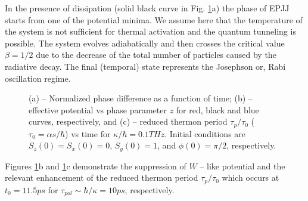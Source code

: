 \documentclass[aps, pre, preprint, groupedaddress, superscriptaddress, showkeys, showpacs] {revtex4-1}
\begin{document}
In the presence of dissipation (solid black curve in Fig. \ref{pic:phase}a) the phase of EPJJ starts from one of the potential minima.
We assume here that the temperature of the system is not sufficient for thermal activation and the quantum tunneling is possible. The system evolves adiabatically and then  crosses the critical value $\beta = 1/2$
due to the decrease of the total number of particles caused by the radiative decay.
The final (temporal) state represents the Josephson or, Rabi oscillation regime.
%
\begin{figure}[ht]
\caption{(a) -- Normalized phase difference as a function of time; (b) -- effective potential vs phase parameter $z$ for red, black and blue curves, respectively, and (c) -- reduced thermon period $\tau_{p} / \tau_0$ ($\tau_0 = \alpha s / \hbar$) vs time for $\kappa/\hbar = 0.1 THz$. 
Initial conditions are $S_z(0) = S_x(0) = 0$, $S_y(0) = 1$, and $\phi(0) = \pi / 2$, respectively.
\label{pic:phase}}
\end{figure}
%

Figures \ref{pic:phase}b and \ref{pic:phase}c demonstrate the suppression of $W$ -- like potential and the relevant enhancement of the reduced thermon period $\tau_{p} / \tau_0$ which occurs at $t_0 = 11.5 ps$ for  $\tau_{pol} \sim \hbar/\kappa= 10 ps$, respectively.
\end{document}
